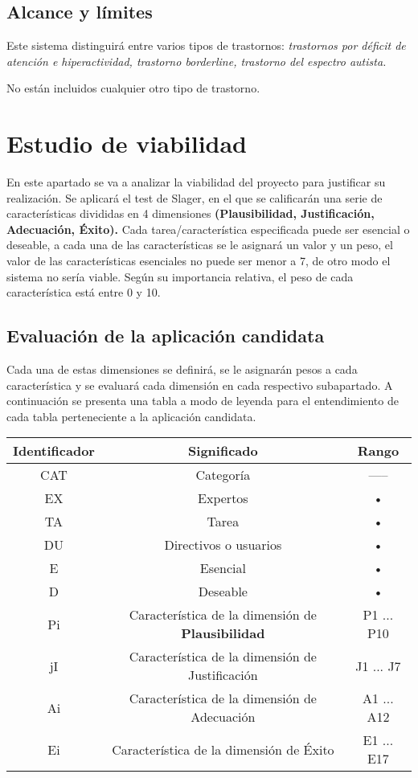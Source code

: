 \documentclass[letterpaper,12pt]{article}
\begin{document}
\subsection{Alcance y límites}
Este sistema distinguirá entre varios tipos de trastornos: \textit{trastornos por déficit de atención e hiperactividad, trastorno borderline, trastorno del espectro autista.}

No están incluidos cualquier otro tipo de trastorno.

\section{Estudio de viabilidad}
En este apartado se va a analizar la viabilidad del proyecto para justificar su realización. Se aplicará el test de Slager, en el que se calificarán una serie de características divididas en 4 dimensiones \textbf{(Plausibilidad, Justificación, Adecuación,
	Éxito).} Cada tarea/característica especificada puede ser esencial o deseable, a cada una de las características se le asignará un valor y un peso, el valor de las características esenciales no puede ser menor a 7, de otro modo el sistema no sería viable. Según su importancia relativa, el peso de cada característica está entre 0 y 10.
\subsection{Evaluación de la aplicación candidata}
Cada una de estas dimensiones se definirá, se le asignarán pesos a cada característica y se evaluará cada dimensión en cada respectivo subapartado.
A continuación se presenta una tabla a modo de leyenda para el entendimiento de cada tabla perteneciente a la aplicación candidata.

\begin{tabular}{|c|c|c|}
	\hline 
	Identificador & Significado & Rango \\ 
	\hline
	CAT & Categoría & ----- \\ 
	\hline 
	EX & Expertos & • \\ 
	\hline 
	TA & Tarea & • \\ 
	\hline 
	DU & Directivos o usuarios & • \\ 
	\hline 
	E & Esencial & • \\ 
	\hline 
	D & Deseable & • \\ 
	\hline 
	Pi & Característica de la dimensión de \textbf{Plausibilidad} & P1 ... P10 \\ 
	\hline 
	jI & Característica de la dimensión de Justificación & J1 ... J7 \\ 
	\hline 
	Ai & Característica de la dimensión de Adecuación & A1 ... A12 \\ 
	\hline 
	Ei & Característica de la dimensión de Éxito & E1 ... E17 \\ 
	\hline 
\end{tabular} \\
\end{document}
